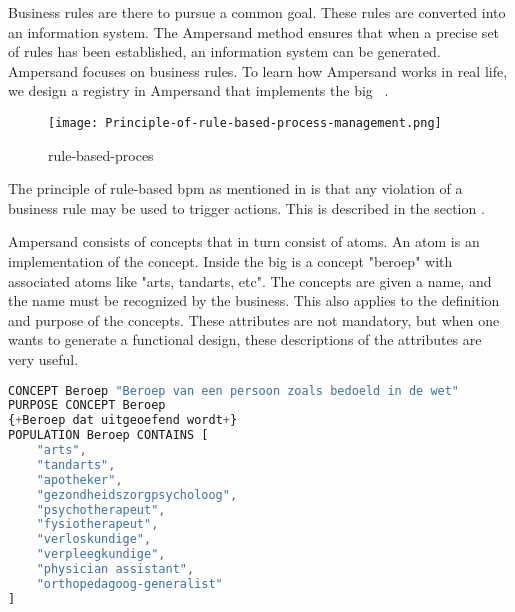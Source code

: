 Business rules are there to pursue a common goal.
These rules are converted into an information system. 
The Ampersand method ensures that when a precise set of rules has been established, an information system can be generated. 
Ampersand focuses on business rules.
To learn how Ampersand works in real life, we design a registry in Ampersand that implements the \acrshort{big}~ .

\begin{wrapfigure} {r}{0.52\textwidth} 
\texttt{[image: Principle-of-rule-based-process-management.png]}
\caption{rule-based-proces}
\label{fig:rule-based-proces}
\end{wrapfigure}


The principle of rule-based \acrfull{bpm} as mentioned in  is that any violation of a business rule may be used to trigger actions. 
This is described in the section .

Ampersand consists of concepts that in turn consist of atoms.
An atom is an implementation of the concept.
Inside the \acrshort{big} is a concept "beroep" with associated atoms like "arts, tandarts, etc".
The concepts are given a name, and the name must be recognized by the business.
This also applies to the definition and purpose of the concepts.
These attributes are not mandatory, but when one wants to generate a functional design, these descriptions of the attributes are very useful.
\begin{lstlisting}[language=Octave] 
CONCEPT Beroep "Beroep van een persoon zoals bedoeld in de wet" 
PURPOSE CONCEPT Beroep 
{+Beroep dat uitgeoefend wordt+}
POPULATION Beroep CONTAINS [
    "arts",
    "tandarts",
    "apotheker",
    "gezondheidszorgpsycholoog",
    "psychotherapeut",
    "fysiotherapeut",
    "verloskundige",
    "verpleegkundige",
    "physician assistant",
    "orthopedagoog-generalist"
]
\end{lstlisting}

